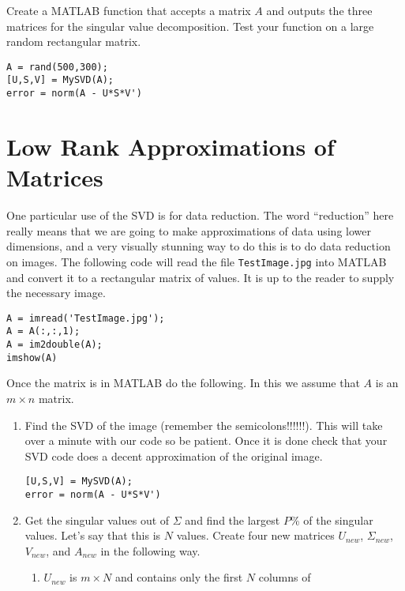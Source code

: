 \begin{problem}
    Create a MATLAB function that accepts a matrix $A$ and outputs the three matrices for
    the singular value decomposition.  Test your function on a large random rectangular
    matrix.
\begin{verbatim}
A = rand(500,300);
[U,S,V] = MySVD(A);
error = norm(A - U*S*V')
\end{verbatim}
\end{problem}






\section{Low Rank Approximations of Matrices}

\begin{problem}
    One particular use of the SVD is for data reduction.  The word ``reduction'' here
    really means that we are going to make approximations of data using lower dimensions,
    and a very visually stunning way to do this is to do data reduction on images.  The following code will read
    the file \texttt{TestImage.jpg} into MATLAB and convert it to a rectangular matrix of
    values.  It is up to the reader to supply the necessary image.
\begin{verbatim}
A = imread('TestImage.jpg');
A = A(:,:,1);
A = im2double(A);
imshow(A)
\end{verbatim}
    Once the matrix is in MATLAB do the following.  In this we assume that $A$ is an $m
    \times n$ matrix.
    \begin{enumerate}
        \item Find the SVD of the image (remember the semicolons!!!!!!).  This will take
            over a minute with our code so be patient.  Once it is done check that your
            SVD code does a decent approximation of the original image.
\begin{verbatim}
[U,S,V] = MySVD(A);
error = norm(A - U*S*V')
\end{verbatim}
        \item Get the singular values out of $\Sigma$ and find the largest $P$\% of the
            singular values. Let's say that this is $N$ values.  Create four new matrices
            $U_{new}$, $\Sigma_{new}$, $V_{new}$, and $A_{new}$ in the following way.
            \begin{enumerate}
                \item $U_{new}$ is $m \times N$ and contains only the first $N$ columns of

\end{enumerate}
\end{enumerate}
\end{problem}
